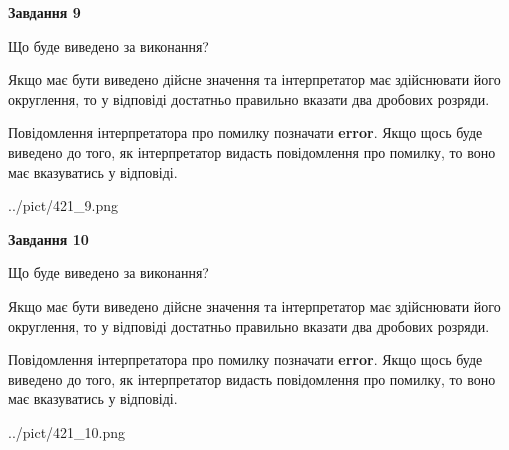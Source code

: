 \documentclass[12pt, ukrainian]{article}
\begin{document}
{\begin {Large}
{\begin {center}\textbf{Завдання 9}\end {center}}\par
Що буде виведено за виконання? \par

Якщо має бути виведено дійсне значення та інтерпретатор має здійснювати його округлення, 
то у відповіді достатньо правильно вказати два дробових розряди.

Повідомлення інтерпретатора про помилку позначати \textbf{error}.
Якщо щось буде виведено до того, як інтерпретатор видасть повідомлення про помилку, 
то воно має вказуватись у відповіді. \par

\begin{center}
	{../pict/421_9.png}
\end{center}
\newpage

{\begin {center}\textbf{Завдання 10}\end {center}}\par
Що буде виведено за виконання? \par

Якщо має бути виведено дійсне значення та інтерпретатор має здійснювати його округлення, 
то у відповіді достатньо правильно вказати два дробових розряди.

Повідомлення інтерпретатора про помилку позначати \textbf{error}.
Якщо щось буде виведено до того, як інтерпретатор видасть повідомлення про помилку, 
то воно має вказуватись у відповіді. \par

\begin{center}
	{../pict/421_10.png}
\end{center}
\newpage

\end {Large}}
\end{document}
